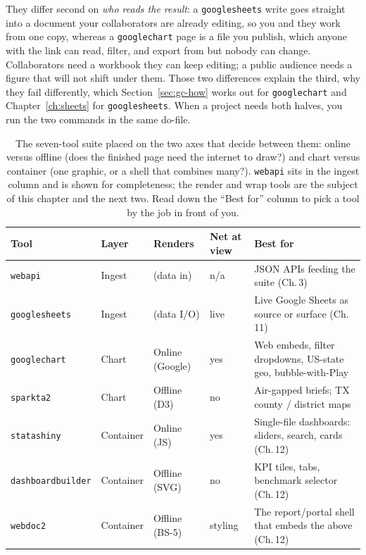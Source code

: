 They differ second on \emph{who reads the result}: a \texttt{googlesheets} write goes straight into a document your collaborators are already editing, so you and they work from one copy, whereas a \texttt{googlechart} page is a file you publish, which anyone with the link can read, filter, and export from but nobody can change. Collaborators need a workbook they can keep editing; a public audience needs a figure that will not shift under them. Those two differences explain the third, why they fail differently, which Section~\ref{sec:gc-how} works out for \texttt{googlechart} and Chapter~\ref{ch:sheets} for \texttt{googlesheets}. When a project needs both halves, you run the two commands in the same do-file.

\begin{table}[htbp]
\centering
\caption[The visualization suite at a glance]{The seven-tool suite placed on the two axes that decide between them: online versus offline (does the finished page need the internet to draw?) and chart versus container (one graphic, or a shell that combines many?). \texttt{webapi} sits in the ingest column and is shown for completeness; the render and wrap tools are the subject of this chapter and the next two. Read down the \enquote{Best for} column to pick a tool by the job in front of you.}
\label{tab:suite-matrix}
{\footnotesize
\setlength{\tabcolsep}{4pt}
\begin{tabular}{lllll}
\hline
Tool & Layer & Renders & Net at view & Best for \\
\hline
\texttt{webapi}      & Ingest    & (data in)      & n/a  & JSON APIs feeding the suite (Ch.\,3) \\
\texttt{googlesheets}& Ingest    & (data I/O)     & live & Live Google Sheets as source or surface (Ch.\,11) \\
\texttt{googlechart} & Chart     & Online (Google)& yes  & Web embeds, filter dropdowns, US-state geo, bubble-with-Play \\
\texttt{sparkta2}    & Chart     & Offline (D3)   & no   & Air-gapped briefs; TX county / district maps \\
\texttt{statashiny}  & Container & Online (JS)    & yes  & Single-file dashboards: sliders, search, cards (Ch.\,12) \\
\texttt{dashboardbuilder} & Container & Offline (SVG) & no & KPI tiles, tabs, benchmark selector (Ch.\,12) \\
\texttt{webdoc2}     & Container & Offline (BS-5) & styling & The report/portal shell that embeds the above (Ch.\,12) \\
\hline
\end{tabular}
}
\end{table}

